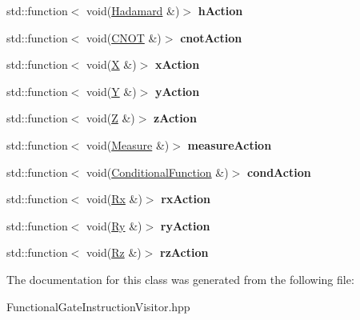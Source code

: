 \begin{DoxyCompactItemize}
\item 
std\+::function$<$ void(\hyperlink{a00036}{Hadamard} \&)$>$ {\bfseries h\+Action}\hypertarget{a00031_a02f1401c9b0d1da801027f3bc0b5227e}{}\label{a00031_a02f1401c9b0d1da801027f3bc0b5227e}

\item 
std\+::function$<$ void(\hyperlink{a00019}{C\+N\+OT} \&)$>$ {\bfseries cnot\+Action}\hypertarget{a00031_a4d6bd8c2fd1af775ed08946942f60a0b}{}\label{a00031_a4d6bd8c2fd1af775ed08946942f60a0b}

\item 
std\+::function$<$ void(\hyperlink{a00070}{X} \&)$>$ {\bfseries x\+Action}\hypertarget{a00031_a9e0295434a2224b776609b057147a9af}{}\label{a00031_a9e0295434a2224b776609b057147a9af}

\item 
std\+::function$<$ void(\hyperlink{a00075}{Y} \&)$>$ {\bfseries y\+Action}\hypertarget{a00031_ae78f91a5cc9a7006f6bb1acee1c00501}{}\label{a00031_ae78f91a5cc9a7006f6bb1acee1c00501}

\item 
std\+::function$<$ void(\hyperlink{a00076}{Z} \&)$>$ {\bfseries z\+Action}\hypertarget{a00031_ae197f358e3d0777feb3656455e2ee672}{}\label{a00031_ae197f358e3d0777feb3656455e2ee672}

\item 
std\+::function$<$ void(\hyperlink{a00045}{Measure} \&)$>$ {\bfseries measure\+Action}\hypertarget{a00031_a239748abedd67c7b30cad12e545d1926}{}\label{a00031_a239748abedd67c7b30cad12e545d1926}

\item 
std\+::function$<$ void(\hyperlink{a00021}{Conditional\+Function} \&)$>$ {\bfseries cond\+Action}\hypertarget{a00031_a5c0595a70b1f7ae50f3e29a985e249e9}{}\label{a00031_a5c0595a70b1f7ae50f3e29a985e249e9}

\item 
std\+::function$<$ void(\hyperlink{a00061}{Rx} \&)$>$ {\bfseries rx\+Action}\hypertarget{a00031_ab79bb3eb3050d1c599061863bb2e219e}{}\label{a00031_ab79bb3eb3050d1c599061863bb2e219e}

\item 
std\+::function$<$ void(\hyperlink{a00062}{Ry} \&)$>$ {\bfseries ry\+Action}\hypertarget{a00031_a229b7d9aae52638c6eff04bd16bb9973}{}\label{a00031_a229b7d9aae52638c6eff04bd16bb9973}

\item 
std\+::function$<$ void(\hyperlink{a00063}{Rz} \&)$>$ {\bfseries rz\+Action}\hypertarget{a00031_a586ab5721150c67ad3ced46e2a236b44}{}\label{a00031_a586ab5721150c67ad3ced46e2a236b44}

\end{DoxyCompactItemize}


The documentation for this class was generated from the following file\+:\begin{DoxyCompactItemize}
\item 
Functional\+Gate\+Instruction\+Visitor.\+hpp\end{DoxyCompactItemize}

